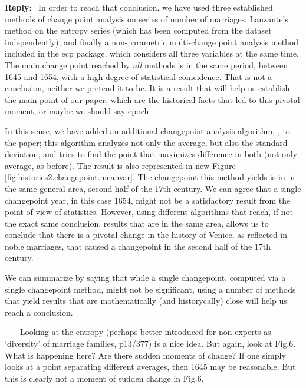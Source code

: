 \documentclass[11pt]{article}
\newcounter{reviewer}
\newcounter{point}[reviewer]
\renewcommand{\thepoint}{P\,\thereviewer.\arabic{point}}
\newenvironment{point}
   {\refstepcounter{point} \bigskip \noindent {\textbf{Reviewer~Point~\thepoint} } ---\ }
   {\par }
\newenvironment{reply}
   {\medskip \noindent \begin{sf}\textbf{Reply}:\  }
   {\medskip \end{sf}}
\begin{document}
\begin{reply}
In order to reach that conclusion, we have used three established methods of
change point analysis on series of number of marriages, Lanzante's method on the
entropy series (which has been computed from the dataset independently), and
finally a non-parametric multi-change point analysis method included in the {\sf
  ecp} package, which considers all three variables at the same time. The main
change point reached by {\em all} methods is in the same period, between 1645
and 1654, with a high degree of statistical coincidence. That is not a
conclusion, neither we pretend it to be. It is a result that will help us
establish the main point of our paper, which are the historical facts that led
to this pivotal moment, or maybe we should say epoch.

In this sense, we have added an additional changepoint analysis algorithm,
\cite{killick}, to the paper; this algorithm analyzes not only the average, but
also the standard deviation, and tries to find the point that maximizes
difference in both (not only average, as before). The result is also
represented in new Figure \ref{fig:histories2.changepoint.meanvar}.
The changepoint this method yields is in in the same general area, second
half of the 17th century. We can agree that a single changepoint year, in this
case 1654, might not be a satisfactory result from the point of view of
statistics. However, using different algorithms that reach, if not the exact
same conclusion, results that are in the same area, allows us to conclude that
there is a pivotal change in the history of Venice, as reflected in noble
marriages, that caused a changepoint in the second half of the 17th century.

We can summarize by saying that while a single changepoint, computed via a
single changepoint method, might not be significant, using a number of methods
that yield results that are mathematically (and historycally) close will help us
reach a conclusion.
\end{reply}

\begin{point}
Looking at the entropy (perhaps better introduced for non-experts as
‘diversity’ of marriage families, p13/377) is a nice idea. But again, look at
Fig.6. What is happening here? Are there sudden moments of change? If
one simply looks at a point separating different averages, then 1645 may
be reasonable. But this is clearly not a moment of sudden change in Fig.6.
\end{point}
\end{document}
